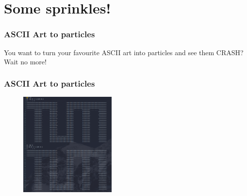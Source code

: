 
\section{Some sprinkles!}

\begin{frame}
    \frametitle{ASCII Art to particles}

    \center
    You want to turn your favourite ASCII art into particles and see them CRASH?
    \newline
    \newline
    \newline
    Wait no more! 

\end{frame}


\begin{frame}
    \frametitle{ASCII Art to particles}

    \begin{figure}[H]
        \includegraphics[width=0.43\textwidth]{res/tuminput.png}
    \end{figure}


\end{frame}
